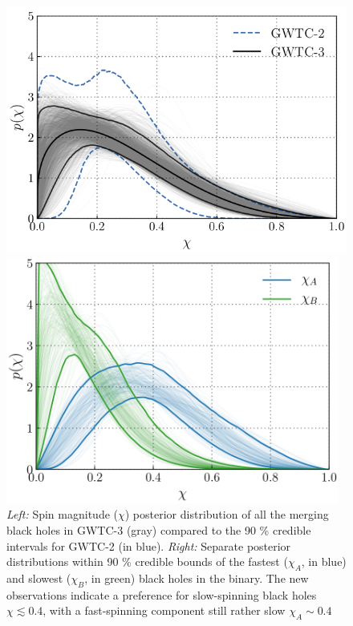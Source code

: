 \documentclass[a4paper,titlepage]{book}     	%
\begin{document}
\begin{figure}[h!]
	\begin{minipage}{.49\textwidth}
		\centering
		\includegraphics[width=\textwidth]{./images/spinmagnitude.png}
	\end{minipage}
	\hfill
	\begin{minipage}{.49\textwidth}
		\vspace{0.8mm}
		\centering
		\includegraphics[width=0.975\textwidth]{./images/spinmagnitudehighlow.png}	
	\end{minipage}
	\caption{\emph{Left:} Spin magnitude ($\chi$) posterior distribution of all the merging black holes in GWTC-3 (gray) compared to the 90 \% credible intervals for GWTC-2 (in blue). \emph{Right:} Separate posterior distributions within 90 \% credible bounds of the fastest ($\chi_A$, in blue) and slowest ($\chi_B$, in green) black holes in the binary. The new observations indicate a preference for slow-spinning black holes $\chi \lesssim 0.4$, with a fast-spinning component still rather slow $\chi_A \sim 0.4$ \cite{GWTC-3_interpretation}} \label{fig:spinmagnitude}
\end{figure}
\end{document}
